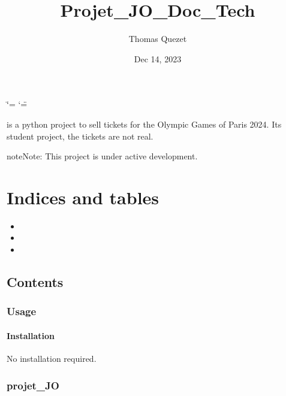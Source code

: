 \documentclass[letterpaper,10pt,english]{sphinxmanual}
\title{Projet\_JO\_Doc\_Tech}
\date{Dec 14, 2023}
\author{Thomas Quezet}
\begin{document}
\ifdefined\shorthandoff
  \ifnum\catcode`\=\string=\active\shorthandoff{=}\fi
  \ifnum\catcode`\"=\active{}\fi
\fi

\pagestyle{empty}
\sphinxmaketitle
\pagestyle{plain}
\sphinxtableofcontents
\pagestyle{normal}
\label{\detokenize{index::doc}}


\sphinxAtStartPar
{} is a python project to sell tickets for the Olympic Games of Paris 2024. It\textquotesingle{}s student project, the tickets are not real.

\begin{sphinxadmonition}{note}{Note:}
\sphinxAtStartPar
This project is under active development.
\end{sphinxadmonition}


\chapter{Indices and tables}
\label{\detokenize{index:indices-and-tables}}\begin{itemize}
\item {} 
\sphinxAtStartPar
{}

\item {} 
\sphinxAtStartPar
{}

\item {} 
\sphinxAtStartPar
{}

\end{itemize}


\section{Contents}
\label{\detokenize{index:contents}}
\sphinxstepscope


\subsection{Usage}
\label{\detokenize{usage:usage}}\label{\detokenize{usage::doc}}

\subsubsection{Installation}
\label{\detokenize{usage:installation}}
\sphinxAtStartPar
No installation required.

\sphinxstepscope


\subsection{projet\_JO}
\label{\detokenize{modules:projet-jo}}\label{\detokenize{modules::doc}}
\sphinxstepscope
\end{document}

